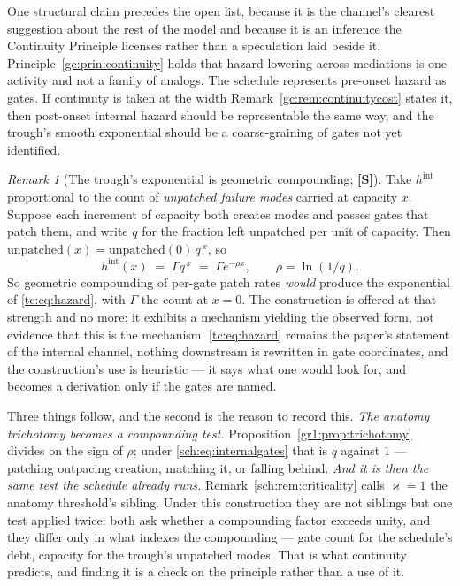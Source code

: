 \documentclass[11pt]{article}
\numberwithin{equation}{section}
\theoremstyle{plain}
\theoremstyle{definition}
\theoremstyle{remark}
\newtheorem{remark}[theorem]{Remark}
\begin{document}
One structural claim precedes the open list, because it is
the channel's clearest suggestion about the rest of the model and because
it is an inference the Continuity Principle licenses rather than a
speculation laid beside it. Principle~\ref{gc:prin:continuity} holds that hazard-lowering across
mediations is one activity and not a family of analogs. The schedule
represents pre-onset hazard as gates. If continuity is taken at the width
Remark~\ref{gc:rem:continuitycost} states it, then post-onset internal
hazard should be representable the same way, and the trough's smooth
exponential should be a coarse-graining of gates not yet identified.

\begin{remark}[The trough's exponential is geometric compounding;
\textbf{[S]}]\label{sch:rem:internalgates}
Take $h^{\mathrm{int}}$ proportional to the count of \emph{unpatched
failure modes} carried at capacity $x$. Suppose each increment of
capacity both creates modes and passes gates that patch them, and write
$q$ for the fraction left unpatched per unit of capacity. Then
$\text{unpatched}(x)=\text{unpatched}(0)\,q^{\,x}$, so
\begin{equation}\label{sch:eq:internalgates}
h^{\mathrm{int}}(x)\;=\;\Gamma q^{\,x}\;=\;\Gamma e^{-\rho x},
\qquad \rho=\ln(1/q).
\end{equation}
So geometric compounding of per-gate patch rates \emph{would} produce
the exponential of \eqref{tc:eq:hazard}, with $\Gamma$ the count at
$x=0$. The construction is offered at that strength and no more: it
exhibits a mechanism yielding the observed form, not evidence that this
is the mechanism. \eqref{tc:eq:hazard} remains the paper's statement of
the internal channel, nothing downstream is rewritten in gate
coordinates, and the construction's use is heuristic --- it says what one
would look for, and becomes a derivation only if the gates are named.

Three things follow, and the second is the reason to record this. \emph{The anatomy trichotomy becomes a compounding test.}
Proposition~\ref{gr1:prop:trichotomy} divides on the sign of $\rho$;
under \eqref{sch:eq:internalgates} that is $q$ against $1$ --- patching
outpacing creation, matching it, or falling behind. \emph{And it is then the same test the schedule already runs.}
Remark~\ref{sch:rem:criticality} calls $\varkappa=1$ the anatomy threshold's
sibling. Under this construction they are not siblings but one test
applied twice: both ask whether a compounding factor exceeds unity, and
they differ only in what indexes the compounding --- gate count for the
schedule's debt, capacity for the trough's unpatched modes. That is what
continuity predicts, and finding it is a check on the principle rather
than a use of it.


\end{remark}
\end{document}
